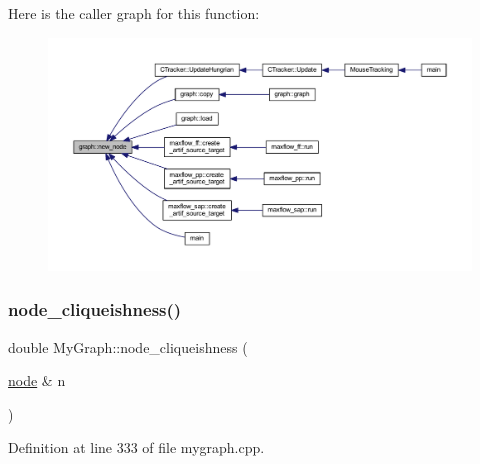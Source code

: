 Here is the caller graph for this function\+:
\nopagebreak
\begin{figure}[H]
\begin{center}
\leavevmode
\includegraphics[width=350pt]{classgraph_ab9505335c20558319b6cce25aed23524_icgraph}
\end{center}
\end{figure}
\mbox{\label{class_my_graph_a513bec2f1949a01d517dd57cc9c30233}} 
\subsubsection{\texorpdfstring{node\+\_\+cliqueishness()}{node\_cliqueishness()}}
{\footnotesize\ttfamily double My\+Graph\+::node\+\_\+cliqueishness (\begin{DoxyParamCaption}\item[{\mbox{\hyperlink{classnode}{node}} \&}]{n }\end{DoxyParamCaption})}



Definition at line 333 of file mygraph.\+cpp.


